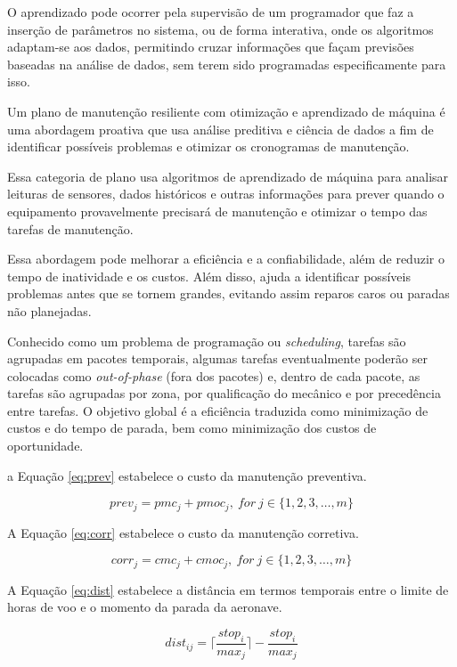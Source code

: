 \documentclass{abntex2}
\begin{document}
\begin{sloppypar}
O aprendizado pode ocorrer pela supervisão de um programador que faz a inserção de parâmetros no sistema, ou de forma interativa, onde os algoritmos adaptam-se aos dados, permitindo cruzar informações que façam previsões baseadas na análise de dados, sem terem sido programadas especificamente para isso.

Um plano de manutenção resiliente com otimização e aprendizado de máquina é uma abordagem proativa que usa análise preditiva e ciência de dados a fim de identificar possíveis problemas e otimizar os cronogramas de manutenção.

Essa categoria de plano usa algoritmos de aprendizado de máquina para analisar leituras de sensores, dados históricos e outras informações para prever quando o equipamento provavelmente precisará de manutenção e otimizar o tempo das tarefas de manutenção.

Essa abordagem pode melhorar a eficiência e a confiabilidade, além de reduzir o tempo de inatividade e os custos. Além disso, ajuda a identificar possíveis problemas antes que se tornem grandes, evitando assim reparos caros ou paradas não planejadas.

Conhecido como um problema de programação ou \textit{scheduling}, tarefas são agrupadas em pacotes temporais, algumas tarefas eventualmente poderão ser colocadas como \textit{out-of-phase} (fora dos pacotes) e, dentro de cada pacote, as tarefas são agrupadas por zona, por qualificação do mecânico e por precedência entre tarefas.
O objetivo global é a eficiência traduzida como minimização de custos e do tempo de parada, bem como minimização dos custos de oportunidade.

a Equação \ref{eq:prev} estabelece o custo da manutenção preventiva.

\begin{equation}\label{eq:prev}
prev_j =  pmc_j + pmoc_j,\ for\ j \in \{1, 2, 3, \ldots, m\}
\end{equation}


A Equação \ref{eq:corr} estabelece o custo da manutenção corretiva.

\begin{equation}\label{eq:corr}
corr_j =  cmc_j + cmoc_j,\ for\ j \in \{1, 2, 3, \ldots, m\}
\end{equation}


A Equação  \ref{eq:dist} estabelece a distância em termos temporais entre o limite de horas de voo e o momento da parada da aeronave.

\begin{equation}\label{eq:dist}
dist_{ij} = \lceil{\frac{stop_i}{max_j}}\rceil{}-\frac{stop_i}{max_j} 
\end{equation}



\end{sloppypar}
\end{document}
